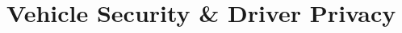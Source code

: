 \documentclass[conference]{IEEEtran}
\begin{document}
%
%
%
%
%
%



%
%
%
%
%
%
%
%



%

 
 
 
 
 
 
 
 
 
 
 
  
% 
% 
% 
% 
% 
 
\section{Vehicle Security \& Driver Privacy}
\end{document}
